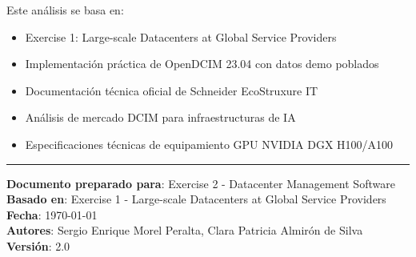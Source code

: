 \documentclass[12pt,a4paper]{article}
\begin{document}
Este análisis se basa en:
\begin{itemize}
    \item Exercise 1: Large-scale Datacenters at Global Service Providers
    \item Implementación práctica de OpenDCIM 23.04 con datos demo poblados
    \item Documentación técnica oficial de Schneider EcoStruxure IT
    \item Análisis de mercado DCIM para infraestructuras de IA
    \item Especificaciones técnicas de equipamiento GPU NVIDIA DGX H100/A100
\end{itemize}

\vspace{1cm}
\hrule
\vspace{0.5cm}
\textbf{Documento preparado para}: Exercise 2 - Datacenter Management Software\\
\textbf{Basado en}: Exercise 1 - Large-scale Datacenters at Global Service Providers\\
\textbf{Fecha}: \today\\
\textbf{Autores}: Sergio Enrique Morel Peralta, Clara Patricia Almirón de Silva\\
\textbf{Versión}: 2.0
\end{document}
